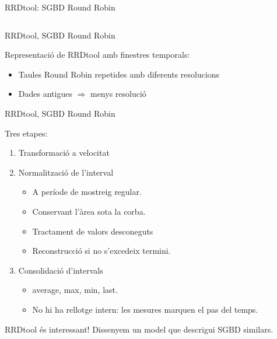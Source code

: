 \begin{frame}{RRDtool: SGBD Round Robin}
\begin{columns}
\end{columns}


\end{frame}



\begin{frame}{RRDtool, SGBD Round Robin}


Representació de RRDtool amb finestres temporals:
  \begin{itemize}
    \item Taules Round Robin repetides amb diferents resolucions
    \item Dades antigues $\Longrightarrow$ menys resolució
  \end{itemize}
\vspace{-1mm}

%


\end{frame}




\begin{frame}{RRDtool, SGBD Round Robin}

Tres etapes: \smallskip
\begin{enumerate}
\item Transformació a velocitat \smallskip

\item Normalització de l'interval 
\begin{itemize}
\item A període de mostreig regular.
\item Conservant l'àrea sota la corba.
\item Tractament de valors desconeguts
\item Reconstrucció si no s'excedeix termini.
\end{itemize}\smallskip

\item Consolidació d'intervals
\begin{itemize}
\item average, max, min, last.
\item No hi ha rellotge intern: les mesures marquen el pas del temps.
\end{itemize}

\end{enumerate}

\bigskip

RRDtool és interessant! Dissenyem un model que descrigui SGBD similars.


\end{frame}




